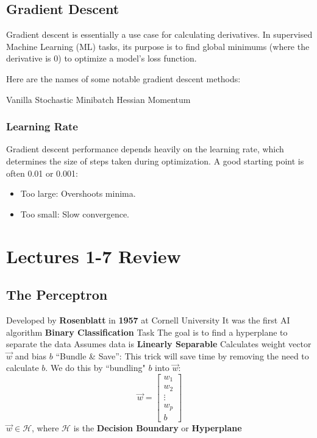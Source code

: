 \documentclass[12pt]{article}
\begin{document}
\subsection{Gradient Descent}
Gradient descent \cite{goodfellow2016deep} is essentially a use case for calculating derivatives. In supervised Machine Learning (ML) tasks, its purpose is to find global minimums (where the derivative is 0) to optimize a model's loss function. 

Here are the names of some notable gradient descent methods:
\begin{outline}
    \1 Vanilla
    \1 Stochastic
    \1 Minibatch
    \1 Hessian
    \1 Momentum
\end{outline}

\subsubsection{Learning Rate}
Gradient descent performance depends heavily on the learning rate, which determines the size of steps taken during optimization. A good starting point is often 0.01 or 0.001:
\begin{itemize}
    \item Too large: Overshoots minima.
    \item Too small: Slow convergence.
\end{itemize}

\section{Lectures 1-7 Review}

\subsection{The Perceptron\cite{rosenblatt1958perceptron}}
\begin{outline}
    \1 Developed by \textbf{Rosenblatt} in \textbf{1957} at Cornell University
    \1 It was the first AI algorithm
    \1 \textbf{Binary Classification} Task
    \1 The goal is to find a hyperplane to separate the data
    \1 Assumes data is \textbf{Linearly Separable}
    \1 Calculates weight vector \(\vec{w}\) and bias \(b\) 
    \1 ``Bundle \& Save'': This trick will save time by removing the need to calculate \(b\). We do this by ``bundling" \(b\) into \(\vec{w}\): 
    \[
    \vec{w} = 
    \begin{bmatrix}
        w_1 \\
        w_2 \\
        \vdots \\
        w_p \\
        b
    \end{bmatrix}
    \]
    \1 \(\vec{w} \in \mathcal{H}\), where \(\mathcal{H}\) is the \textbf{Decision Boundary} or \textbf{Hyperplane}
\end{outline}
\end{document}
